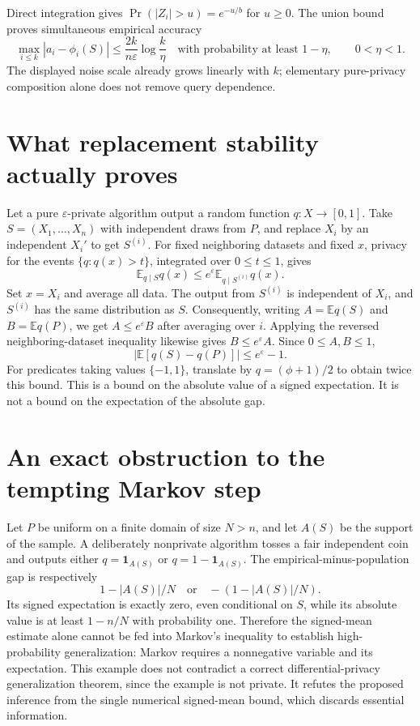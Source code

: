 \documentclass[11pt]{article}
\begin{document}
Direct integration gives $\Pr(|Z_i|>u)=e^{-u/b}$ for $u\ge0$.
The union bound proves simultaneous empirical accuracy
\[
\max_{i\le k}|a_i-\phi_i(S)|
\le\frac{2k}{n\varepsilon}\log\frac{k}{\eta}
\quad\text{with probability at least }1-\eta,
\qquad 0<\eta<1.
\]
The displayed noise scale already grows linearly with $k$; elementary
pure-privacy composition alone does not remove query dependence.

\section{What replacement stability actually proves}
Let a pure $\varepsilon$-private algorithm output a random function
$q:X\to[0,1]$. Take $S=(X_1,\ldots,X_n)$ with independent draws from
$P$, and replace $X_i$ by an independent $X_i'$ to get $S^{(i)}$.
For fixed neighboring datasets and fixed $x$, privacy for the events
$\{q:q(x)>t\}$, integrated over $0\le t\le1$, gives
\[
\mathbb E_{q\mid S}q(x)
\le e^\varepsilon\mathbb E_{q\mid S^{(i)}}q(x).
\]
Set $x=X_i$ and average all data. The output from $S^{(i)}$ is
independent of $X_i$, and $S^{(i)}$ has the same distribution as $S$.
Consequently, writing $A=\mathbb E q(S)$ and
$B=\mathbb E q(P)$, we get $A\le e^\varepsilon B$ after averaging
over $i$. Applying the reversed neighboring-dataset inequality likewise
gives $B\le e^\varepsilon A$.
Since $0\le A,B\le1$,
\[
|\mathbb E[q(S)-q(P)]|\le e^\varepsilon-1.
\]
For predicates taking values $\{-1,1\}$, translate by
$q=(\phi+1)/2$ to obtain twice this bound.
This is a bound on the absolute value of a signed expectation. It is
not a bound on the expectation of the absolute gap.

\section{An exact obstruction to the tempting Markov step}
Let $P$ be uniform on a finite domain of size $N>n$, and let $A(S)$ be
the support of the sample. A deliberately nonprivate algorithm tosses
a fair independent coin and outputs either $q=\mathbf1_{A(S)}$ or
$q=1-\mathbf1_{A(S)}$. The empirical-minus-population gap is respectively
\[
1-|A(S)|/N\quad\text{or}\quad-(1-|A(S)|/N).
\]
Its signed expectation is exactly zero, even conditional on $S$, while
its absolute value is at least $1-n/N$ with probability one.
Therefore the signed-mean estimate alone cannot be fed into Markov's
inequality to establish high-probability generalization: Markov requires
a nonnegative variable and its expectation. This example does not
contradict a correct differential-privacy generalization theorem, since
the example is not private. It refutes the proposed inference from the
single numerical signed-mean bound, which discards essential information.
\end{document}
